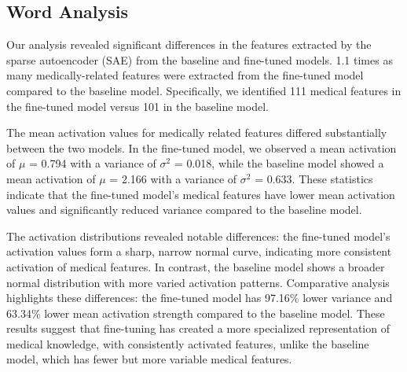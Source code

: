 

\subsection{Word Analysis} %

Our analysis revealed significant differences in the features extracted by the sparse autoencoder (SAE) from the baseline and fine-tuned models. 1.1 times as many medically-related features were extracted from the fine-tuned model compared to the baseline model. Specifically, we identified 111 medical features in the fine-tuned model versus 101 in the baseline model.

The mean activation values for medically related features differed substantially between the two models. In the fine-tuned model, we observed a mean activation of $\mu$ = 0.794 with a variance of $\sigma^{2}$ = 0.018, while the baseline model showed a mean activation of $\mu$ = 2.166 with a variance of $\sigma^{2}$ = 0.633. These statistics indicate that the fine-tuned model's medical features have lower mean activation values and significantly reduced variance compared to the baseline model.

The activation distributions revealed notable differences: the fine-tuned model's activation values form a sharp, narrow normal curve, indicating more consistent activation of medical features. In contrast, the baseline model shows a broader normal distribution with more varied activation patterns. Comparative analysis highlights these differences: the fine-tuned model has 97.16\% lower variance and 63.34\% lower mean activation strength compared to the baseline model. These results suggest that fine-tuning has created a more specialized representation of medical knowledge, with consistently activated features, unlike the baseline model, which has fewer but more variable medical features.

